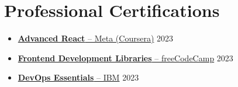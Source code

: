 \documentclass[11pt]{article}
\begin{document}
\section{Professional Certifications}
\begin{itemize}
\item \href{https://www.coursera.org/account/accomplishments/verify/QC73X86DWCRK}{\textbf{Advanced React} -- Meta (Coursera)} \hfill 2023
\item \href{https://www.freecodecamp.org/certification/fcc36860a3c-366f-4e05-8655-9eeeba048998/front-end-development-libraries}{\textbf{Frontend Development Libraries} -- freeCodeCamp} \hfill 2023
\item \href{https://www.credly.com/badges/41de71d0-506d-4fc4-98b8-3d72b7d4fd44/linked_in_profile}{\textbf{DevOps Essentials} -- IBM} \hfill 2023
\end{itemize}

\end{document}
